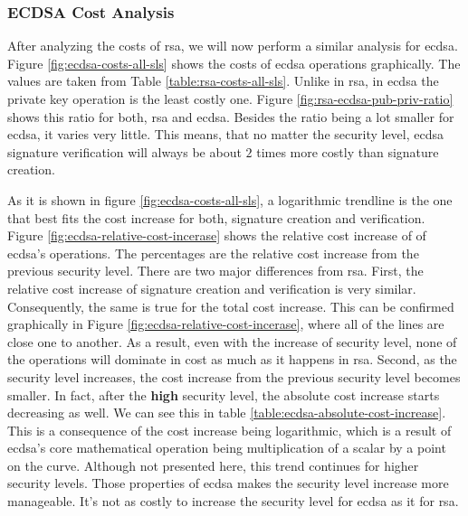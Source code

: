 \subsubsection{ECDSA Cost Analysis}

After analyzing the costs of \gls{rsa}, we will now perform a similar analysis for \gls{ecdsa}. Figure \ref{fig:ecdsa-costs-all-sls}
shows the costs of \gls{ecdsa} operations graphically. The values are taken from Table \ref{table:rsa-costs-all-sls}. Unlike in \gls{rsa},
in \gls{ecdsa} the private key operation is the least costly one. Figure \ref{fig:rsa-ecdsa-pub-priv-ratio} shows this ratio for both,
\gls{rsa} and \gls{ecdsa}. Besides the ratio being a lot smaller for \gls{ecdsa}, it varies very little. This means, that no matter
the security level, \gls{ecdsa} signature verification will always be about $2$ times more costly than signature creation.

As it is shown in figure \ref{fig:ecdsa-costs-all-sls}, a logarithmic trendline is the one that best fits the cost increase for both,
signature creation and verification.
Figure \ref{fig:ecdsa-relative-cost-incerase} shows the relative cost increase of of \gls{ecdsa}'s operations. The percentages
are the relative cost increase from the previous security level. There are two major differences from \gls{rsa}. First, the relative cost increase
of signature creation and verification is very similar. Consequently, the same is true for the total cost increase. This can be confirmed
graphically in Figure \ref{fig:ecdsa-relative-cost-incerase}, where all of the lines are
close one to another. As a result, even with the increase of security level, none of the operations will dominate in cost as much as it happens
in \gls{rsa}. Second, as the security level increases, the cost increase from the previous security level becomes smaller. In fact, after the
\textbf{high} security level, the absolute cost increase starts decreasing as well. We can see this in table \ref{table:ecdsa-absolute-cost-increase}.
This is a consequence of the cost increase being logarithmic, which is a result of \gls{ecdsa}'s core mathematical operation being
multiplication of a scalar by a point on the curve. Although not presented here, this trend continues for higher security levels.
Those properties of \gls{ecdsa} makes the security level increase more manageable. It's not as costly to increase the security level for
\gls{ecdsa} as it for \gls{rsa}.

